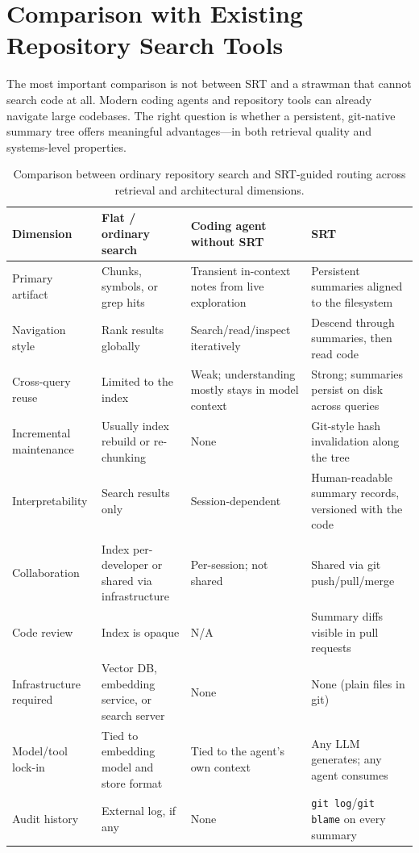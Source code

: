 \documentclass[11pt,a4paper]{article}
\newcommand{\srt}{\textsc{SRT}}
\begin{document}
\section{Comparison with Existing Repository Search Tools}\label{sec:comparison}

The most important comparison is not between \srt{} and a strawman that cannot search code at all. Modern coding agents and repository tools can already navigate large codebases. The right question is whether a persistent, git-native summary tree offers meaningful advantages---in both retrieval quality and systems-level properties.

\begin{table}[!htbp]
\centering
\caption{Comparison between ordinary repository search and \srt{}-guided routing across retrieval and architectural dimensions.}\label{tab:comparison}
\footnotesize
\begin{tabularx}{\textwidth}{lXXX}
\toprule
\textbf{Dimension} & \textbf{Flat / ordinary search} & \textbf{Coding agent without SRT} & \textbf{\srt{}} \\
\midrule
Primary artifact & Chunks, symbols, or grep hits & Transient in-context notes from live exploration & Persistent summaries aligned to the filesystem \\
\addlinespace
Navigation style & Rank results globally & Search/read/inspect iteratively & Descend through summaries, then read code \\
\addlinespace
Cross-query reuse & Limited to the index & Weak; understanding mostly stays in model context & Strong; summaries persist on disk across queries \\
\addlinespace
Incremental maintenance & Usually index rebuild or re-chunking & None & Git-style hash invalidation along the tree \\
\addlinespace
Interpretability & Search results only & Session-dependent & Human-readable summary records, versioned with the code \\
\addlinespace
\midrule
\multicolumn{4}{l}{\textit{Architectural properties}} \\
\addlinespace
Collaboration & Index per-developer or shared via infrastructure & Per-session; not shared & Shared via git push/pull/merge \\
\addlinespace
Code review & Index is opaque & N/A & Summary diffs visible in pull requests \\
\addlinespace
Infrastructure required & Vector DB, embedding service, or search server & None & None (plain files in git) \\
\addlinespace
Model/tool lock-in & Tied to embedding model and store format & Tied to the agent's own context & Any LLM generates; any agent consumes \\
\addlinespace
Audit history & External log, if any & None & \texttt{git log}/\texttt{git blame} on every summary \\
\bottomrule
\end{tabularx}
\end{table}
\end{document}
